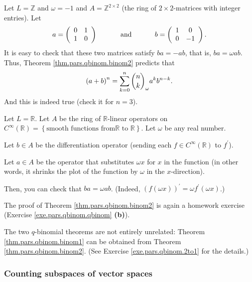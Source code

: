 \begin{example}
Let $L=\mathbb{Z}$ and $\omega=-1$ and $A=\mathbb{Z}^{2\times2}$ (the ring of
$2\times2$-matrices with integer entries). Let%
\[
a=\left(
\begin{array}
[c]{cc}%
0 & 1\\
1 & 0
\end{array}
\right)  \ \ \ \ \ \ \ \ \ \ \text{and}\ \ \ \ \ \ \ \ \ \ b=\left(
\begin{array}
[c]{cc}%
1 & 0\\
0 & -1
\end{array}
\right)  .
\]
It is easy to check that these two matrices satisfy $ba=-ab$, that is,
$ba=\omega ab$. Thus, Theorem \ref{thm.pars.qbinom.binom2} predicts that%
\[
\left(  a+b\right)  ^{n}=\sum_{k=0}^{n}\dbinom{n}{k}_{\omega}a^{k}b^{n-k}.
\]
And this is indeed true (check it for $n=3$).
\end{example}

\begin{example}
Let $L=\mathbb{R}$. Let $A$ be the ring of $\mathbb{R}$-linear operators on
$C^{\infty}\left(  \mathbb{R}\right)  =\left\{  \text{smooth functions from
}\mathbb{R}\text{ to }\mathbb{R}\right\}  $. Let $\omega$ be any real number.

Let $b\in A$ be the differentiation operator (sending each $f\in C^{\infty
}\left(  \mathbb{R}\right)  $ to $f^{\prime}$).

Let $a\in A$ be the operator that substitutes $\omega x$ for $x$ in the
function (in other words, it shrinks the plot of the function by $\omega$ in
the $x$-direction).

Then, you can check that $ba=\omega ab$. (Indeed, $\left(  f\left(  \omega
x\right)  \right)  ^{\prime}=\omega f^{\prime}\left(  \omega x\right)  $.)
\end{example}

The proof of Theorem \ref{thm.pars.qbinom.binom2} is again a homework exercise
(Exercise \ref{exe.pars.qbinom.qbinom} \textbf{(b)}).

The two $q$-binomial theorems are not entirely unrelated: Theorem
\ref{thm.pars.qbinom.binom1} can be obtained from Theorem
\ref{thm.pars.qbinom.binom2}. (See Exercise \ref{exe.pars.qbinom.2to1} for the details.)

\subsubsection{Counting subspaces of vector spaces}

